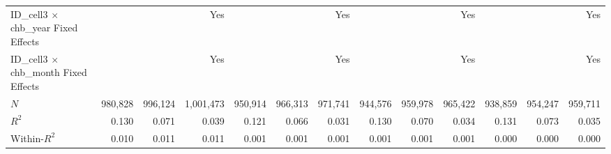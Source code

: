 \begin{tabular}{lrrrrrrrrrrrr}
ID\_cell3 $\times$ chb\_year Fixed Effects  &              &              &          Yes &              &              &          Yes &              &              &          Yes &              &              &          Yes \\ 
ID\_cell3 $\times$ chb\_month Fixed Effects &              &              &          Yes &              &              &          Yes &              &              &          Yes &              &              &          Yes \\ 
\midrule
$N$                                         &      980,828 &      996,124 &    1,001,473 &      950,914 &      966,313 &      971,741 &      944,576 &      959,978 &      965,422 &      938,859 &      954,247 &      959,711 \\ 
$R^2$                                       &        0.130 &        0.071 &        0.039 &        0.121 &        0.066 &        0.031 &        0.130 &        0.070 &        0.034 &        0.131 &        0.073 &        0.035 \\ 
Within-$R^2$                                &        0.010 &        0.011 &        0.011 &        0.001 &        0.001 &        0.001 &        0.001 &        0.001 &        0.001 &        0.000 &        0.000 &        0.000 \\ 
\bottomrule
\end{tabular}
